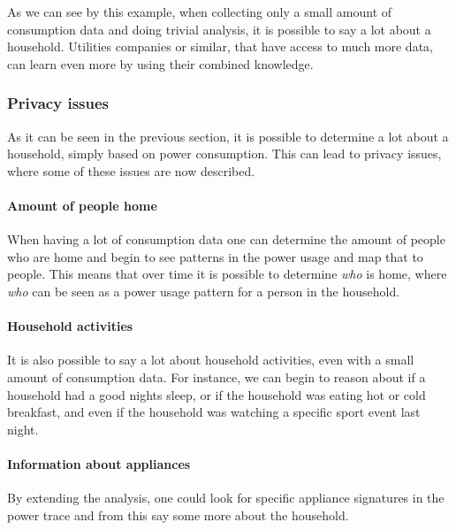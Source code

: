 As we can see by this example, when collecting only a small amount of consumption data and doing trivial analysis, it is possible to say a lot about a household.
Utilities companies or similar, that have access to much more data, can learn even more by using their combined knowledge.

\subsubsection{Privacy issues}\label{privacy_concerns}
As it can be seen in the previous section, it is possible to determine a lot about a household, simply based on power consumption.
This can lead to privacy issues, where some of these issues are now described.

\paragraph{Amount of people home}
When having a lot of consumption data one can determine the amount of people who are home and begin to see patterns in the power usage and map that to people.
This means that over time it is possible to determine \textit{who} is home, where \textit{who} can be seen as a power usage pattern for a person in the household.

\paragraph{Household activities}
  
It is also possible to say a lot about household activities, even with a small amount of consumption data.
For instance, we can begin to reason about if a household had a good nights sleep, or if the household was eating hot or cold breakfast, and even if the household was watching a specific sport event last night.
\paragraph{Information about appliances}
By extending the analysis, one could look for specific appliance signatures in the power trace and from this say some more about the household.



